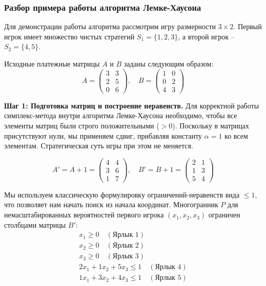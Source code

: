\subsubsection{Разбор примера работы алгоритма Лемке-Хаусона}

Для демонстрации работы алгоритма рассмотрим игру размерности $3 \times 2$.
Первый игрок имеет множество чистых стратегий $S_1 = \{1, 2, 3\}$, а второй игрок – $S_2 = \{4, 5\}$. 

Исходные платежные матрицы $A$ и $B$ заданы следующим образом:
$$
A = \begin{pmatrix}
    3 & 3 \\ 
    2 & 5 \\
    0 & 6 
    \end{pmatrix}, 
\quad 
B = \begin{pmatrix} 
    1 & 0 \\ 
    0 & 2 \\ 
    4 & 3 
    \end{pmatrix}
$$

\textbf{Шаг 1: Подготовка матриц и построение неравенств.}
Для корректной работы симплекс-метода внутри алгоритма Лемке-Хаусона необходимо, чтобы все элементы матриц были строго положительными ($> 0$). Поскольку в матрицах присутствуют нули, мы применяем сдвиг, прибавляя константу $\alpha = 1$ ко всем элементам. Стратегическая суть игры при этом не меняется.

$$
A' = A + 1 = \begin{pmatrix} 
    4 & 4 \\ 
    3 & 6 \\ 
    1 & 7 \end{pmatrix}, 
    \quad 
B' = B + 1 = \begin{pmatrix} 
    2 & 1 \\ 
    1 & 3 \\ 
    5 & 4 \end{pmatrix}
$$

Мы используем классическую формулировку ограничений-неравенств вида $\le 1$, что позволяет нам начать поиск из начала координат. Многогранник $P$ для немасштабированных вероятностей первого игрока $(x_1, x_2, x_3)$ ограничен столбцами матрицы $B'$:
\begin{align}
    x_1 \ge 0 \quad (\text{Ярлык } 1) \\
    x_2 \ge 0 \quad (\text{Ярлык } 2) \\
    x_3 \ge 0 \quad (\text{Ярлык } 3) \\
    2x_1 + 1x_2 + 5x_3 \le 1 \quad (\text{Ярлык } 4) \\
    1x_1 + 3x_2 + 4x_3 \le 1 \quad (\text{Ярлык } 5)
\end{align}

